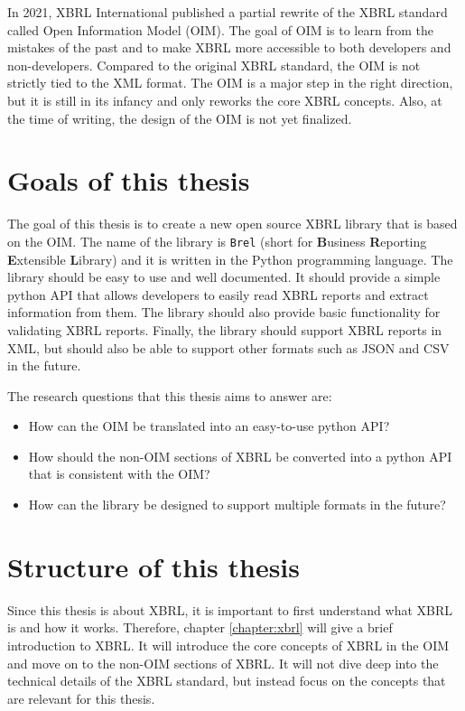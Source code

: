 In 2021, XBRL International published a partial rewrite of the XBRL standard called Open Information Model (OIM)\cite{oim}.
The goal of OIM is to learn from the mistakes of the past and to make XBRL more accessible to both developers and non-developers.
Compared to the original XBRL standard, the OIM is not strictly tied to the XML format.
The OIM is a major step in the right direction, but it is still in its infancy and only reworks the core XBRL concepts.
Also, at the time of writing, the design of the OIM is not yet finalized.

\section{Goals of this thesis}

The goal of this thesis is to create a new open source XBRL library that is based on the OIM.
The name of the library is \texttt{Brel} (short for \textbf{B}usiness \textbf{R}eporting \textbf{E}xtensible \textbf{L}ibrary) and it is written in the Python programming language.
The library should be easy to use and well documented.
It should provide a simple python API that allows developers to easily read XBRL reports and extract information from them.
The library should also provide basic functionality for validating XBRL reports.
Finally, the library should support XBRL reports in XML, but should also be able to support other formats such as JSON and CSV in the future.

The research questions that this thesis aims to answer are:

\begin{itemize}
    \item How can the OIM be translated into an easy-to-use python API?
    \item How should the non-OIM sections of XBRL be converted into a python API that is consistent with the OIM?
    \item How can the library be designed to support multiple formats in the future?
\end{itemize}

\section{Structure of this thesis}

Since this thesis is about XBRL, it is important to first understand what XBRL is and how it works.
Therefore, chapter \ref{chapter:xbrl} will give a brief introduction to XBRL. 
It will introduce the core concepts of XBRL in the OIM and move on to the non-OIM sections of XBRL.
It will not dive deep into the technical details of the XBRL standard, but instead focus on the concepts that are relevant for this thesis.

